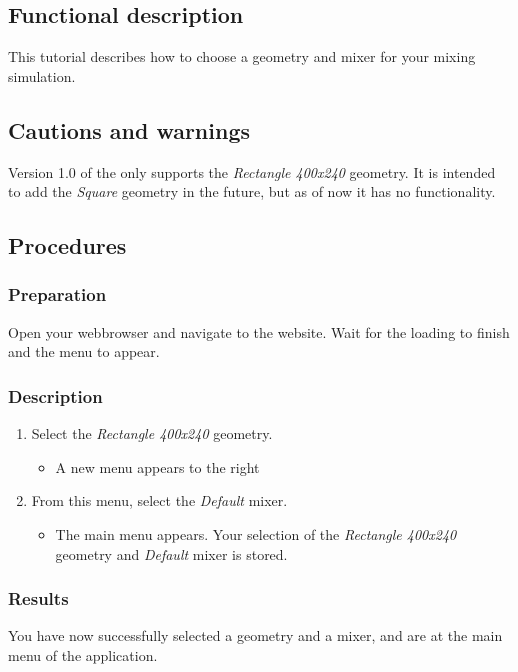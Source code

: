\subsection{Functional description}
This tutorial describes how to choose a geometry and mixer for your mixing simulation.

\subsection{Cautions and warnings}

Version 1.0 of the \applicationname only supports the \emph{Rectangle 400x240} geometry. It is intended to add the \emph{Square} geometry in the future, but as of now it has no functionality.\\

\subsection{Procedures}

\subsubsection{Preparation}
Open your webbrowser and navigate to the \projectname website. Wait for the loading to finish and the menu to appear.

\subsubsection{Description}

\begin{enumerate}
\item Select the \emph{Rectangle 400x240} geometry.
\begin{itemize}
  \item A new menu appears to the right
\end{itemize}
\item From this menu, select the \emph{Default} mixer.
\begin{itemize}
  \item The main menu appears. Your selection of the \emph{Rectangle 400x240} geometry and \emph{Default} mixer is stored.
\end{itemize}
\end{enumerate}

\subsubsection{Results}
You have now successfully selected a geometry and a mixer, and are at the main menu of the application.

